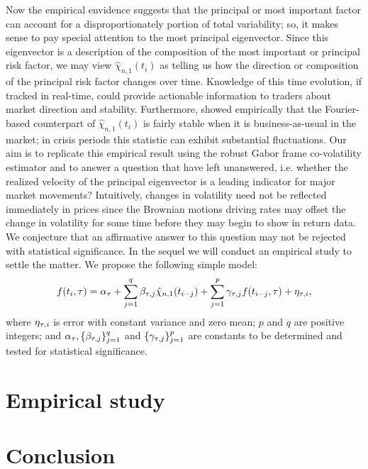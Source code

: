 Now the empirical envidence \citep{Carmona2006} suggests that the principal or most important factor can account for a disproportionately portion of total variability; so, it makes sense to pay special attention to the most principal eigenvector. Since this eigenvector is a description of  the composition of the most important or principal  risk factor, we may view $\hat{\chi}_{n,1} (t_i)$ as telling us how the direction or composition of the principal risk factor changes  over time. Knowledge of this time evolution, if tracked in real-time, could provide actionable information to traders about market  direction and stability.
Furthermore, \cite{Malliavin2007} showed empirically that the  Fourier-based counterpart of $\hat{\chi}_{n,1} (t_i)$ is fairly stable  when it is business-as-usual in the market; in crisis periods  this statistic can exhibit substantial fluctuations. Our aim is to replicate this empirical result using the robust  Gabor frame co-volatility estimator  and to answer a question that \cite{Malliavin2007} have left unanswered, i.e. whether the realized velocity  of the  principal eigenvector is a leading indicator for major market movements? Intuitively, changes in volatility need not be reflected immediately in prices since the Brownian motions driving rates may offset the change in volatility for some time before they may begin to show in return data.  We conjecture that  an affirmative answer to this question may not be rejected with statistical significance. In the sequel  we will   conduct an empirical study to settle the matter. We propose the following simple model:
\begin{align}
  f(t_i, \tau) = \alpha_{\tau} + \sum_{j=1}^q\beta_{\tau,j} \hat{\chi}_{n,1} (t_{i-j}) + \sum_{j=1}^p\gamma_{\tau,j} f(t_{i-j},\tau)+ \eta_{\tau,i},
  \label{}
\end{align}
where $\eta_{\tau,i}$ is \iid error with constant variance and zero mean; $p$ and $q$ are positive integers; and $\alpha_{\tau}, \{\beta_{\tau,j}\}_{j=1}^q$ and $\{\gamma_{\tau,j}\}_{j=1}^p$ are constants to be determined and tested for statistical significance.
\section{Empirical study}
\section{Conclusion}
